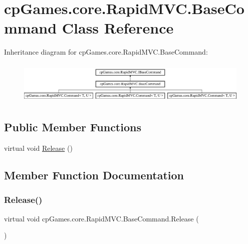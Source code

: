 \hypertarget{classcp_games_1_1core_1_1_rapid_m_v_c_1_1_base_command}{}\section{cp\+Games.\+core.\+Rapid\+M\+V\+C.\+Base\+Command Class Reference}
\label{classcp_games_1_1core_1_1_rapid_m_v_c_1_1_base_command}
Inheritance diagram for cp\+Games.\+core.\+Rapid\+M\+V\+C.\+Base\+Command\+:\begin{figure}[H]
\begin{center}
\leavevmode
\includegraphics[height=2.043796cm]{classcp_games_1_1core_1_1_rapid_m_v_c_1_1_base_command}
\end{center}
\end{figure}
\subsection*{Public Member Functions}
\begin{DoxyCompactItemize}
\item 
virtual void \mbox{\hyperlink{classcp_games_1_1core_1_1_rapid_m_v_c_1_1_base_command_afa3a355d140a2a088cfa7e5f4d71a07b}{Release}} ()
\end{DoxyCompactItemize}


\subsection{Member Function Documentation}
\mbox{\label{classcp_games_1_1core_1_1_rapid_m_v_c_1_1_base_command_afa3a355d140a2a088cfa7e5f4d71a07b}} 
\subsubsection{\texorpdfstring{Release()}{Release()}}
{\footnotesize\ttfamily virtual void cp\+Games.\+core.\+Rapid\+M\+V\+C.\+Base\+Command.\+Release (\begin{DoxyParamCaption}{ }\end{DoxyParamCaption})\hspace{0.3cm}{\ttfamily [virtual]}}



